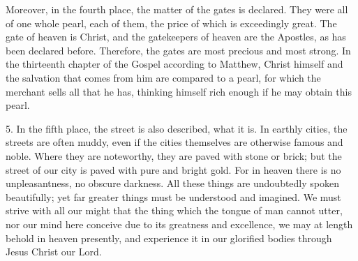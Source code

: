 Moreover, in the fourth place, the matter of the gates is declared. They were all of one whole pearl, each of them, the price of which is exceedingly great. The gate of heaven is Christ, and the gatekeepers of heaven are the Apostles, as has been declared before. Therefore, the gates are most precious and most strong. In the thirteenth chapter of the Gospel according to Matthew, Christ himself and the salvation that comes from him are compared to a pearl, for which the merchant sells all that he has, thinking himself rich enough if he may obtain this pearl.

5. In the fifth place, the street is also described, what it is. In earthly cities, the streets are often muddy, even if the cities themselves are otherwise famous and noble. Where they are noteworthy, they are paved with stone or brick; but the street of our city is paved with pure and bright gold. For in heaven there is no unpleasantness, no obscure darkness. All these things are undoubtedly spoken beautifully; yet far greater things must be understood and imagined. We must strive with all our might that the thing which the tongue of man cannot utter, nor our mind here conceive due to its greatness and excellence, we may at length behold in heaven presently, and experience it in our glorified bodies through Jesus Christ our Lord.
